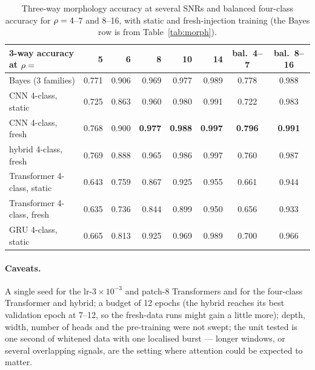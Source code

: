 \begin{table}[h]\centering\small
\begin{tabular}{lrrrrrcc}
\toprule
3-way accuracy at $\rho=$ & 5 & 6 & 8 & 10 & 14 & bal.\ 4--7 & bal.\ 8--16\\
\midrule
Bayes (3 families) & 0.771 & 0.906 & 0.969 & 0.977 & 0.989 & 0.778 & 0.988\\
CNN 4-class, static & 0.725 & 0.863 & 0.960 & 0.980 & 0.991 & 0.722 & 0.983\\
CNN 4-class, fresh & 0.768 & 0.900 & \textbf{0.977} & \textbf{0.988} & \textbf{0.997} & \textbf{0.796} & \textbf{0.991}\\
hybrid 4-class, fresh & 0.769 & 0.888 & 0.965 & 0.986 & 0.997 & 0.760 & 0.987\\
Transformer 4-class, static & 0.643 & 0.759 & 0.867 & 0.925 & 0.955 & 0.661 & 0.944\\
Transformer 4-class, fresh & 0.635 & 0.736 & 0.844 & 0.899 & 0.950 & 0.656 & 0.933\\
GRU 4-class, static & 0.665 & 0.813 & 0.925 & 0.969 & 0.989 & 0.700 & 0.966\\
\bottomrule
\end{tabular}
\caption{Three-way morphology accuracy at several SNRs and balanced four-class accuracy for $\rho=4$--7 and 8--16, with static and fresh-injection training (the Bayes row is from Table~\ref{tab:morph}).}\label{tab:mcfresh}
\end{table}

\paragraph{Caveats.} A single seed for the lr-$3\times10^{-3}$ and patch-8 Transformers and for the four-class Transformer and hybrid; a budget of 12 epochs (the hybrid reaches its best validation epoch at 7--12, so the fresh-data runs might gain a little more); depth, width, number of heads and the pre-training were not swept; the unit tested is one second of whitened data with one localised burst --- longer windows, or several overlapping signals, are the setting where attention could be expected to matter.

